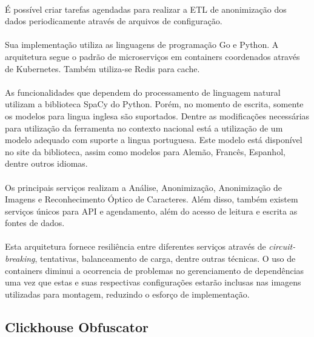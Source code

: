 \paragraph{} É possível criar tarefas agendadas para realizar a ETL de anonimização dos dados periodicamente através de arquivos de configuração.

\paragraph{} Sua implementação utiliza as linguagens de programação Go e Python. A arquitetura segue o padrão de microserviços em containers coordenados através de Kubernetes. Também utiliza-se Redis para cache.

\paragraph{} As funcionalidades que dependem do processamento de linguagem natural utilizam a biblioteca SpaCy do Python. Porém, no momento de escrita, somente
os modelos para lingua inglesa são suportados.\cite{presidio-issue303} Dentre as modificações necessárias para utilização da ferramenta no contexto nacional está a utilização de um modelo
adequado com suporte a lingua portuguesa. Este modelo está disponível no site da biblioteca\cite{spacy}, assim como modelos para Alemão, Francês, Espanhol, dentre outros idiomas.

\paragraph{} Os principais serviços realizam a Análise, Anonimização, Anonimização de Imagens e Reconhecimento Óptico de Caracteres.
Além disso, também existem serviços únicos para API e agendamento, além do acesso de leitura e escrita as fontes de dados.

\paragraph{} Esta arquitetura fornece resiliência entre diferentes serviços através de \textit{circuit-breaking}, tentativas, balanceamento de carga, dentre outras técnicas.
O uso de containers diminui a ocorrencia de problemas no gerenciamento de dependências\cite{merkel2014docker} uma vez que estas e suas respectivas configurações estarão inclusas nas imagens utilizadas para montagem, reduzindo o esforço de implementação.

\subsection{Clickhouse Obfuscator}

